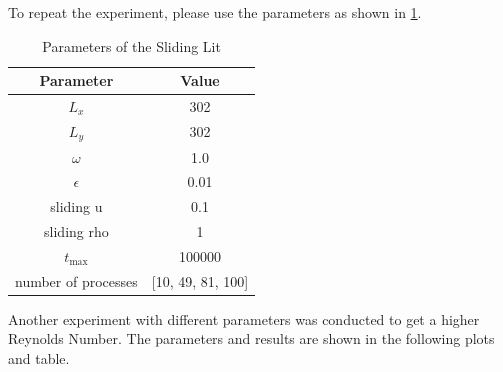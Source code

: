 To repeat the experiment, please use the parameters as shown in \cref{tab:sl-parameters}.
\begin{table}[H]
    \centering %
    \begin{tabular}{c c}
        \hline\hline %
        Parameter           & Value \\ [0.5ex] %
        \hline %
        $L_x$               & 302               \\
        $L_y$               & 302               \\
        $\omega$            & 1.0               \\
        $\epsilon$          & 0.01              \\
        sliding u           & 0.1               \\
        sliding rho         & 1                 \\
        $t_{\max}$          & 100000            \\
        number of processes & [10, 49, 81, 100]  \\[1ex] %
        \hline %
    \end{tabular}
    \caption{Parameters of the Sliding Lit} %
    \label{tab:sl-parameters}
\end{table}

Another experiment with different parameters was conducted to get a higher Reynolds Number.
The parameters and results are shown in the following plots and table.



